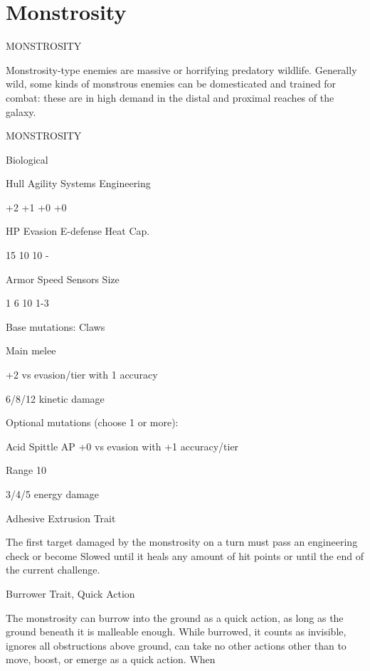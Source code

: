 \section{Monstrosity}
                                           MONSTROSITY  

Monstrosity-type enemies are massive or horrifying predatory wildlife. Generally wild, some kinds  
of monstrous enemies can be domesticated and trained for combat: these are in high demand in  
the distal and proximal reaches of the galaxy. 
 

       MONSTROSITY 

       Biological 

       Hull       Agility      Systems       Engineering 

       +2         +1           +0            +0 

       HP         Evasion      E-defense     Heat Cap. 

       15         10           10            - 

       Armor      Speed        Sensors       Size 

       1          6            10            1-3 

Base mutations:  
Claws
 
Main melee
 
+2 vs evasion/tier with 1 accuracy
 
6/8/12 kinetic damage
 

Optional mutations (choose 1 or more):
 

Acid Spittle  
AP  
+0 vs evasion with +1 accuracy/tier
 
Range 10
 
3/4/5 energy damage
 

Adhesive Extrusion  
Trait
 
The first target damaged by the monstrosity on a turn must pass an engineering check or  
become Slowed until it heals any amount of hit points or until the end of the current challenge.
 

Burrower  
Trait, Quick Action
 
The monstrosity can burrow into the ground as a quick action, as long as the ground beneath it  
is malleable enough. While burrowed, it counts as invisible, ignores all obstructions above  
ground, can take no other actions other than to move, boost, or emerge as a quick action. When  

                                                                                                           


